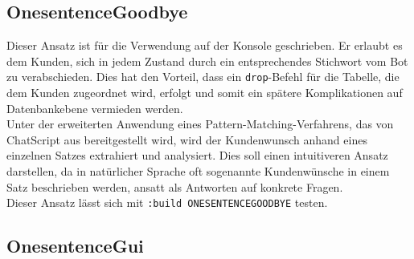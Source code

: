 \subsection{OnesentenceGoodbye}
\label{sec:OnesentenceGoodbye}

Dieser Ansatz ist für die Verwendung auf der Konsole geschrieben. Er erlaubt es dem Kunden, sich in jedem Zustand durch ein entsprechendes Stichwort vom Bot zu verabschieden. Dies hat den Vorteil, dass ein \lstinline|drop|-Befehl für die Tabelle, die dem Kunden zugeordnet wird, erfolgt und somit ein spätere Komplikationen auf Datenbankebene vermieden werden.\\
Unter der erweiterten Anwendung eines Pattern-Matching-Verfahrens, das von ChatScript aus bereitgestellt wird, wird der Kundenwunsch anhand eines einzelnen Satzes extrahiert und analysiert. Dies soll einen intuitiveren Ansatz darstellen, da in natürlicher Sprache oft sogenannte Kundenwünsche in einem Satz beschrieben werden, ansatt als Antworten auf konkrete Fragen.\\
Dieser Ansatz lässt sich mit \lstinline|:build ONESENTENCEGOODBYE| testen.\\

\subsection{OnesentenceGui}
\label{sec:OnesentenceGui}

